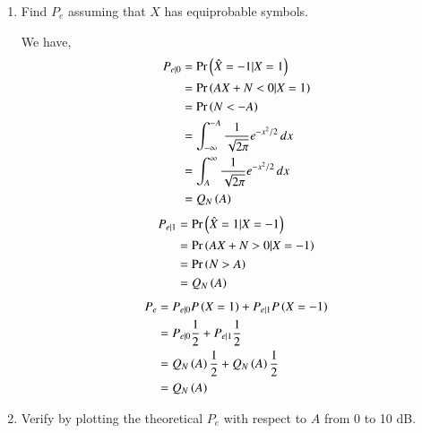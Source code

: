 \documentclass[journal,12pt,twocolumn]{IEEEtran}
\renewcommand\thesection{\arabic{section}}
\begin{document}
\begin{enumerate}[label=\thesection.\arabic*
,ref=\thesection.\theenumi]
\solution
\begin{lstlisting}
wget https://github.com/tejalkul/AI1110-Assignments/blob/main/AI1110%20Random%20Variables%20Assignment/codes/exrand.c
wget https://github.com/tejalkul/AI1110-Assignments/blob/main/AI1110%20Random%20Variables%20Assignment/codes/coeffs.h
\end{lstlisting}
Values obtained
\begin{align}
    P_{e|0} &= 0.311084 \\
    P_{e|1} &= 0.311586
\end{align}
%
\item Find $P_e$ assuming that $X$ has equiprobable symbols.

\solution
We have,
\begin{align}
    P_{e|0} &= \Pr\left(\hat{X} = -1|X=1\right) \\
            &= \Pr\left(AX + N < 0|X=1\right) \\    
            &= \Pr\left(N < -A\right) \\
            &= \int_{-\infty}^{-A} \frac{1}{\sqrt{2\pi}}e^{-x^2/2}\,dx  \\
            &= \int_{A}^{\infty} \frac{1}{\sqrt{2\pi}}e^{-x^2/2}\,dx  \\
            &= Q_{N}\left(A\right)
\end{align}
%
\begin{align}
    P_{e|1} &= \Pr\left(\hat{X} = 1|X=-1\right) \\
            &= \Pr\left(AX + N > 0|X=-1\right) \\    
            &= \Pr\left(N > A\right) \\
            &= Q_{N}\left(A\right)
\end{align}
%
\begin{align}
    P_e &= P_{e|0}P\left(X = 1\right) + P_{e|1}P\left(X = -1\right) \\
        &= P_{e|0}\frac{1}{2} + P_{e|1}\frac{1}{2} \\
        &= Q_{N}\left(A\right)\frac{1}{2} + Q_{N}\left(A\right)\frac{1}{2} \\
        &= Q_{N}\left(A\right)
\end{align}
\item
Verify by plotting  the theoretical $P_e$ with respect to $A$ from 0 to 10 dB.


\end{enumerate}
\end{document}
